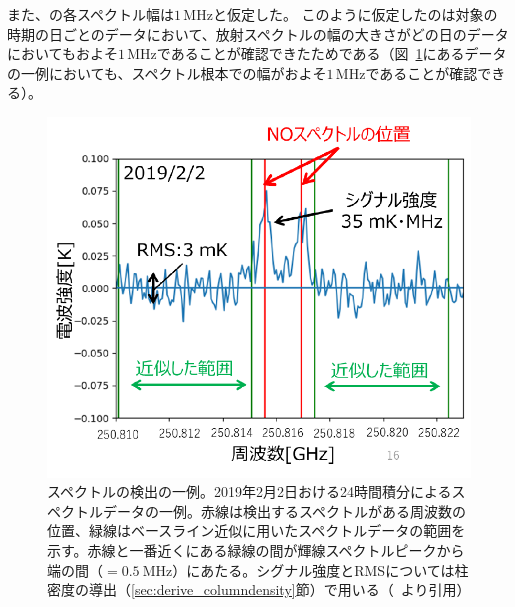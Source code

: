 また、の各スペクトル幅は$1\, \mathrm{MHz}$と仮定した。
このように仮定したのは対象の時期の日ごとのデータにおいて、放射スペクトルの幅の大きさがどの日のデータにおいてもおよそ$1\, \mathrm{MHz}$であることが確認できたためである（図~\ref{fig:no_spectr_exp}にあるデータの一例においても、スペクトル根本での幅がおよそ$1\, \mathrm{MHz}$であることが確認できる）。
\begin{figure}[htbp]
    \centering
    \includegraphics[width=\linewidth]{master_thesis_contents/master_thesis_fig/no_spectr_exp.pdf}
    \caption{スペクトルの検出の一例。2019年2月2日おける24時間積分によるスペクトルデータの一例。赤線は検出するスペクトルがある周波数の位置、緑線はベースライン近似に用いたスペクトルデータの範囲を示す。赤線と一番近くにある緑線の間が輝線スペクトルピークから端の間（$=0.5\ \mathrm{MHz}$）にあたる。シグナル強度とRMSについては柱密度の導出（\ref{sec:derive_columndensity}節）で用いる（~\cite{goto2021bachelor}より引用）}
    \label{fig:no_spectr_exp}
\end{figure}
\clearpage


